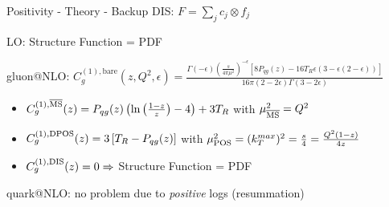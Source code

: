 \author[Felix Hekhorn]{}

\begin{frame}{Positivity - Theory - Backup}
DIS: $F = \sum_j c_j \otimes f_j$

LO: Structure Function = PDF

gluon@NLO: $C^{(1),\text{bare}}_{g}(z,Q^2,\epsilon) = \frac{ \Gamma(-\epsilon)
  \left(\frac{s}{4\pi\mu^2}\right)^{-\epsilon} \left[8P_{qg}(z)-16 T_R \epsilon (3
    -\epsilon(2 -\epsilon) )  \right]  }{16\pi (2 - 2\epsilon) \Gamma (3 - 2 \epsilon)}$
\begin{itemize}
\item ${C^{(1),{\overline{\rm {MS}}}}_{g}}(z) = P_{qg}(z) \left( \ln\left(\frac{1-z}{z}\right) - 4 \right) + 3T_R$ with $\mu_{{\overline{\rm {MS}}}}^2 = Q^2$
\item $C^{(1),\rm {DPOS}}_{g}(z) = 3\left[T_R- P_{qg}(z)\right]$ with $\mu_{\rm {POS}}^2 = (k_T^{max})^2 = \frac s 4 = \frac{Q^2(1-z)}{4z}$
\item ${C^{(1),\rm{DIS}}_{g}}(z) = 0 \Rightarrow$ Structure Function = PDF
\end{itemize}

quark@NLO: no problem due to \textit{positive} logs (resummation)
\end{frame}
